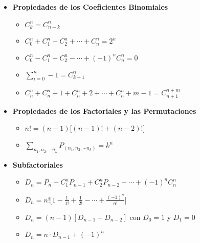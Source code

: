 \begin{itemize}
    \item{
		\textbf{Propiedades de los Coeficientes Binomiales}
		\begin{itemize}
			\item{
				$C_k^n = C_{n-k}^n$
			}
			\item{
				$ C_0^n + C_1^n + C_2^n + \cdots + C_n^n = 2^n $
			}
			\item{
				$ C_0^n - C_1^n + C_2^n - \cdots + (-1)^n C_n^n = 0 $	
			}
			\item{
				$ \sum_{i=0}^n-1 = C_{k+1}^n $	
			}
			\item{
				$ C_n^n + C_n^n+1 + C_n^n+2 + \cdots + C_n^n+m-1 = C_{n+1}^{n+m} $
			}
		\end{itemize}
    }
    \item{
		\textbf{Propiedades de los Factoriales y las Permutaciones}
		\begin{itemize}
			\item{
				$ n! = (n-1)\bigl[(n-1)! + (n-2)!\bigr] $
			}
			\item{
				$ \sum_{n_1, n_2, \cdots n_k} P_(n_1, n_2, \cdots n_k) = k^n $
			}
		\end{itemize}
    }
    \item{
		\textbf{Subfactoriales}
		\begin{itemize}
			\item{
				$ D_n = P_n - C_1^n P_{n-1} + C_2^n P_{n-2} - \cdots + (-1)^n C_n^n $	
			}
			\item{
				$ D_n = n! \bigl[ 1 - \frac{1}{1!} + \frac{1}{2!} - \cdots + \frac{(-1)^n}{n!} \bigr]$	
			}
			\item{
				$ D_n = (n-1)[D_{n-1} + D_{n-2}] $ con $ D_0 = 1 $ y $ D_1 = 0 $	
			}
			\item{
				$D_n = n \cdot D_{n-1} + (-1)^n $
			}
		\end{itemize}
    }
\end{itemize}
